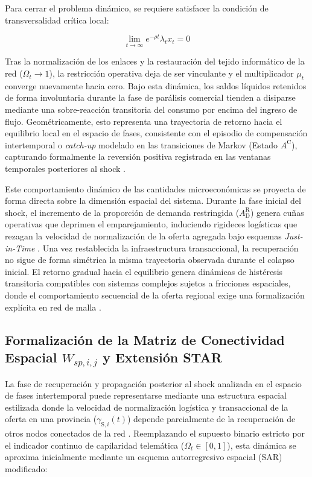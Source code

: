 Para cerrar el problema din\'amico, se requiere satisfacer la condici\'on de transversalidad cr\'itica local:

\begin{equation}
\lim_{t\to\infty} e^{-\rho t}\lambda_t x_t = 0
\end{equation}

Tras la normalizaci\'on de los enlaces y la restauraci\'on del tejido inform\'atico de la red ($\Omega_t \to 1$), la restricci\'on operativa deja de ser vinculante y el multiplicador $\mu_t$ converge nuevamente hacia cero. Bajo esta din\'amica, los saldos l\'iquidos retenidos de forma involuntaria durante la fase de par\'alisis comercial tienden a disiparse mediante una sobre-reacci\'on transitoria del consumo por encima del ingreso de flujo. Geom\'etricamente, esto representa una trayectoria de retorno hacia el equilibrio local en el espacio de fases, consistente con el episodio de compensaci\'on intertemporal o \textit{catch-up} modelado en las transiciones de Markov (Estado $A^{\text{C}}$), capturando formalmente la reversi\'on positiva registrada en las ventanas temporales posteriores al shock \citep{crouzet2023shocks}.

Este comportamiento din\'amico de las cantidades microecon\'omicas se proyecta de forma directa sobre la dimensi\'on espacial del sistema. Durante la fase inicial del shock, el incremento de la proporci\'on de demanda restringida ($A_{\text{D}}^{\text{R}}$) genera cu\~nas operativas que deprimen el emparejamiento, induciendo rigideces log\'isticas que rezagan la velocidad de normalizaci\'on de la oferta agregada bajo esquemas \textit{Just-in-Time} \citep{carvalho2021supply}. Una vez restablecida la infraestructura transaccional, la recuperaci\'on no sigue de forma sim\'etrica la misma trayectoria observada durante el colapso inicial. El retorno gradual hacia el equilibrio genera din\'amicas de hist\'eresis transitoria compatibles con sistemas complejos sujetos a fricciones espaciales, donde el comportamiento secuencial de la oferta regional exige una formalizaci\'on expl\'icita en red de malla \citep{acemoglu2012network, strogatz2015nonlinear}.

\subsection{Formalizaci\'on de la Matriz de Conectividad Espacial $W_{sp,i,j}$ y Extensi\'on STAR}
\label{sec:B_5}

La fase de recuperaci\'on y propagaci\'on posterior al shock analizada en el espacio de fases intertemporal puede representarse mediante una estructura espacial estilizada donde la velocidad de normalizaci\'on log\'istica y transaccional de la oferta en una provincia ($\gamma_{\text{S},i}(t)$) depende parcialmente de la recuperaci\'on de otros nodos conectados de la red \citep{acemoglu2012network}. Reemplazando el supuesto binario estricto por el indicador continuo de capilaridad telem\'atica ($\Omega_t \in [0,1]$), esta din\'amica se aproxima inicialmente mediante un esquema autorregresivo espacial (SAR) modificado:

